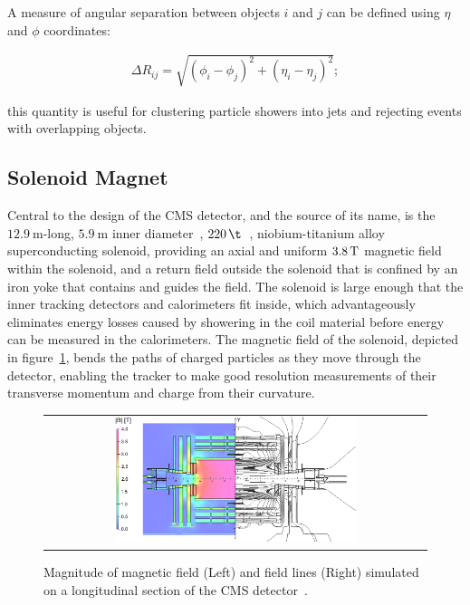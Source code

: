 A measure of angular separation between objects $i$ and $j$ can be defined using $\eta$ and $\phi$ coordinates:
\begin{linenomath*}
\begin{align}
\Delta R_{ij} = \sqrt {{(\phi_i - \phi_j)}^2+{(\eta_i - \eta_j)}^2};
\label{DeltaR}
\end{align}
\end{linenomath*}
this quantity is useful for clustering particle showers into jets and rejecting events with overlapping objects.

\subsection{Solenoid Magnet}
Central to the design of the CMS detector, and the source of its name, is the $\SI{12.9}{\m}$-long, $\SI{5.9}{\m}$ inner diameter~\cite{Bayatian:922757}, $\SI{220}{\t}$~\cite{Chatrchyan:1129810}, niobium-titanium alloy superconducting solenoid, providing an axial and uniform $\SI{3.8}{\T}$ magnetic field within the solenoid, and a return field outside the solenoid that is confined by an iron yoke that contains and guides the field.
The solenoid is large enough that the inner tracking detectors and calorimeters fit inside, which advantageously eliminates energy losses caused by showering in the coil material before energy can be measured in the calorimeters.
The magnetic field of the solenoid, depicted in figure~\ref{Solenoid}, bends the paths of charged particles as they move through the detector, enabling the tracker to make good resolution measurements of their transverse momentum and charge from their curvature.
\begin{figure}[htb]
  \begin{center}
    \begin{tabular}{c}
        \includegraphics[width=0.65\textwidth]{fig_LHC_CMS/Solenoid.png}
    \end{tabular}
    \caption{Magnitude of magnetic field (Left) and field lines (Right) simulated on a longitudinal section of the CMS detector~\cite{Chatrchyan:1215500}.
            }
    \label{Solenoid}
  \end{center}
\end{figure}


